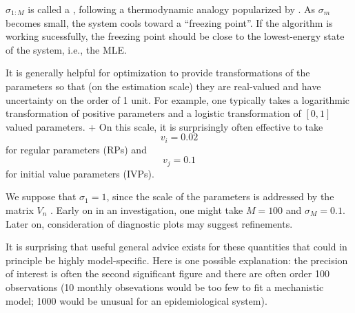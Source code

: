 \documentclass{beamer}\usepackage[]{graphicx}\usepackage[]{color}
\begin{document}
\begin{frame}[fragile]
\item  $\sigma_{1:M}$ is called a , following a thermodynamic analogy popularized by . As $\sigma_m$ becomes small, the system cools toward a ``freezing point''. If the algorithm is working sucessfully, the freezing point should be close to the lowest-energy state of the system, i.e., the MLE.


\item  It is generally helpful for optimization to provide transformations of the parameters so that (on the estimation scale) they are real-valued and have uncertainty on the order of 1 unit. For example, one typically takes a logarithmic transformation of positive parameters and a logistic transformation of $[0,1]$ valued parameters.
+ On this scale, it is surprisingly often effective to take
$$ v_i = 0.02$$
for regular parameters (RPs) and 
$$ v_j = 0.1$$
for initial value parameters (IVPs).

\item  We suppose that $\sigma_1=1$, since the scale of the parameters is addressed by the matrix $V_n$ . Early on in an investigation, one might take $M=100$ and $\sigma_M=0.1$. Later on, consideration of diagnostic plots may suggest refinements. 

\item  It is surprising that useful general advice exists for these quantities that could in principle be highly model-specific.
Here is one possible explanation: the precision of interest is often the second significant figure and there are often order 100 observations (10 monthly obsevations would be too few to fit a mechanistic model; 1000 would be unusual for an epidemiological system). 
\ei

\end{frame}
\end{document}

